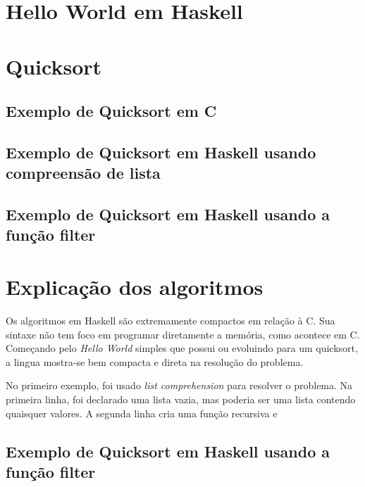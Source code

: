 \documentclass[
  article,			       %
  12pt,				         %
  oneside,			       %
  a4paper,			       %
  english,		       	 %
  brazil,			      	 %
  sumario=tradicional
]{abntex2}
\begin{document}
    \section{Hello World em Haskell}
      

    \section{Quicksort}
      \subsection{Exemplo de Quicksort em C}


      
      \subsection{Exemplo de Quicksort em Haskell usando compreensão de lista} 

            

      \newpage

      \subsection{Exemplo de Quicksort em Haskell usando a função filter}

      

      \section{Explicação dos algoritmos}
      Os algoritmos em Haskell são extremamente compactos em relação à C. Sua sintaxe não tem foco
      em programar diretamente a memória, como acontece em C. Começando pelo \emph{Hello World} simples que possui ou evoluindo
      para um quicksort, a lingua mostra-se bem compacta e direta na resolução do problema.

      No primeiro exemplo, foi usado \emph{list comprehension} para resolver o problema. Na primeira linha,
      foi declarado uma lista vazia, mas poderia ser uma lista contendo quaisquer valores. A segunda linha
      cria uma função recursiva e 

      \subsection{Exemplo de Quicksort em Haskell usando a função filter}
\end{document}
